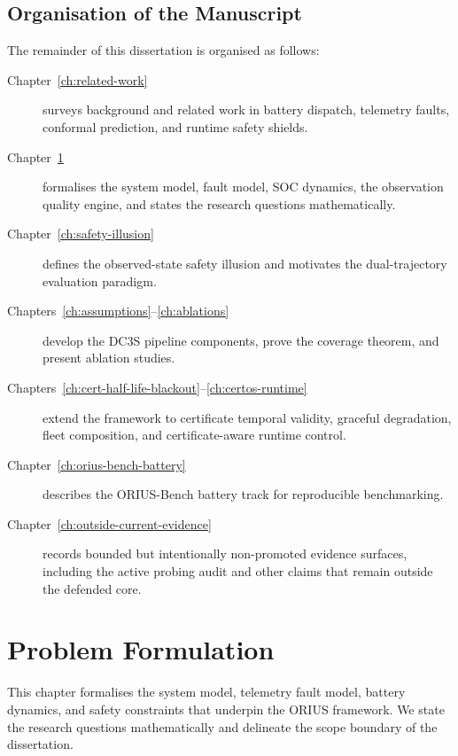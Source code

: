 \subsection{Organisation of the Manuscript}

The remainder of this dissertation is organised as follows:

\begin{description}
  \item[Chapter~\ref{ch:related-work}] surveys background and related work
    in battery dispatch, telemetry faults, conformal prediction, and
    runtime safety shields.
  \item[Chapter~\ref{ch:problem-formulation}] formalises the system model,
    fault model, SOC dynamics, the observation quality engine, and states
    the research questions mathematically.
  \item[Chapter~\ref{ch:safety-illusion}] defines the observed-state
    safety illusion and motivates the dual-trajectory evaluation paradigm.
  \item[Chapters~\ref{ch:assumptions}--\ref{ch:ablations}] develop the DC3S pipeline components, prove the
    coverage theorem, and present ablation studies.
  \item[Chapters~\ref{ch:cert-half-life-blackout}--\ref{ch:certos-runtime}]
    extend the framework to certificate temporal validity, graceful
    degradation, fleet composition, and certificate-aware runtime control.
  \item[Chapter~\ref{ch:orius-bench-battery}] describes the ORIUS-Bench
    battery track for reproducible benchmarking.
  \item[Chapter~\ref{ch:outside-current-evidence}] records bounded but
    intentionally non-promoted evidence surfaces, including the active
    probing audit and other claims that remain outside the defended core.
\end{description}



\section{Problem Formulation}
\label{ch:problem-formulation}
\label{ch:formal-problem-formulation}

This chapter formalises the system model, telemetry fault model, battery
dynamics, and safety constraints that underpin the ORIUS framework.  We
state the research questions mathematically and delineate the scope
boundary of the dissertation.

